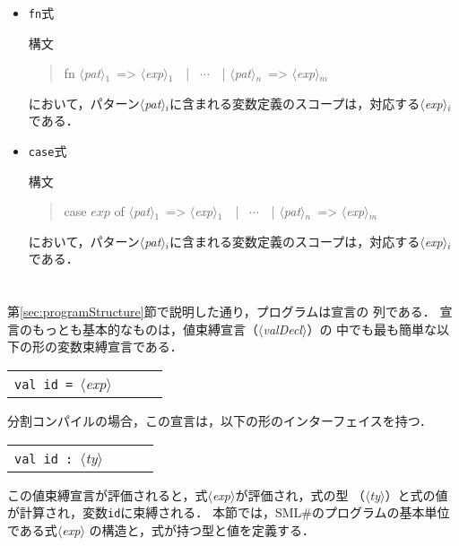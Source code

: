 \documentclass{jbook}
\newif\ifjp
\newcommand{\txt}[2]{#2}
\newcommand{\smlsharp}{SML\#}
\newcommand{\code}[1]{\mbox{\large\tt #1}}
\newcommand{\nonterm}[1]{\mbox{$\langle$}{\it #1}\mbox{$\rangle$}}
\newcommand{\term}[1]{\mbox{{\tt #1}}}
\newenvironment{program}{\begin{quote}\begin{tt}}%
                        {\end{tt}\end{quote}}
\begin{document}
\begin{itemize}
\item \code{fn}式

構文
\begin{program}
fn \nonterm{pat}$_1$\  => \nonterm{exp}$_1$\ \ | \ $\cdots$\ \ | \nonterm{pat}$_n$\  => \nonterm{exp}$_m$
\end{program}
において，パターン\nonterm{pat}$_{i}$に含まれる変数定義のスコープは，対応する\nonterm{exp}$_i$である．

\item \code{case}式

構文
\begin{program}
case $exp$ of \nonterm{pat}$_1$\  => \nonterm{exp}$_1$\ \ | \ $\cdots$\ \ | \nonterm{pat}$_n$\  => \nonterm{exp}$_m$
\end{program}
において，パターン\nonterm{pat}$_{i}$に含まれる変数定義のスコープは，対応する\nonterm{exp}$_i$である．
\end{itemize}

\chapter{\txt{式の構文と評価}{}}
\label{sce:expressionsAndPatterns}
\ifjp%
	第\ref{sec:programStructure}節で説明した通り，プログラムは宣言の
列である．
	宣言のもっとも基本的なものは，値束縛宣言（\nonterm{valDecl}）の
中でも最も簡単な以下の形の変数束縛宣言である．

\begin{center}
\begin{tabular}{lcll}
\term{val}\ \term{id}\ \term{=}\ \nonterm{exp}
\end{tabular}
\end{center}

	分割コンパイルの場合，この宣言は，以下の形のインターフェイスを持つ．

\begin{center}
\begin{tabular}{lcll}
\term{val}\ \term{id}\ \term{:}\ \nonterm{ty}
\end{tabular}
\end{center}

	この値束縛宣言が評価されると，式\nonterm{exp}が評価され，式の型
（\nonterm{ty}）と式の値が計算され，変数\term{id}に束縛される．
	本節では，\smlsharp{}のプログラムの基本単位である式\nonterm{exp}
の構造と，式が持つ型と値を定義する．

\chapter{\txt{式の構造}{}}
\label{sec:expSyntax}
\end{document}
